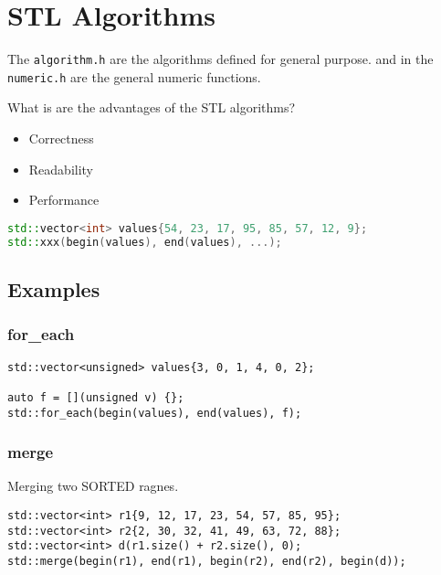 \section{STL Algorithms}
The \lstinline|algorithm.h| are the algorithms defined for general purpose. and in the \lstinline|numeric.h| are the general numeric functions.

What is are the advantages of the STL algorithms?
\begin{itemize}
	\itemsep -0.5em 
	\item Correctness
	\item Readability
	\item Performance
\end{itemize}



\begin{lstlisting}[language=C++]
std::vector<int> values{54, 23, 17, 95, 85, 57, 12, 9}; 
std::xxx(begin(values), end(values), ...);
\end{lstlisting}

\subsection{Examples}
\subsubsection{for\_each}
\begin{lstlisting}
std::vector<unsigned> values{3, 0, 1, 4, 0, 2};

auto f = [](unsigned v) {}; 
std::for_each(begin(values), end(values), f);
\end{lstlisting}

\subsubsection{merge}
Merging two SORTED ragnes.
\begin{lstlisting}
std::vector<int> r1{9, 12, 17, 23, 54, 57, 85, 95}; 
std::vector<int> r2{2, 30, 32, 41, 49, 63, 72, 88}; 
std::vector<int> d(r1.size() + r2.size(), 0);
std::merge(begin(r1), end(r1), begin(r2), end(r2), begin(d));
\end{lstlisting}

